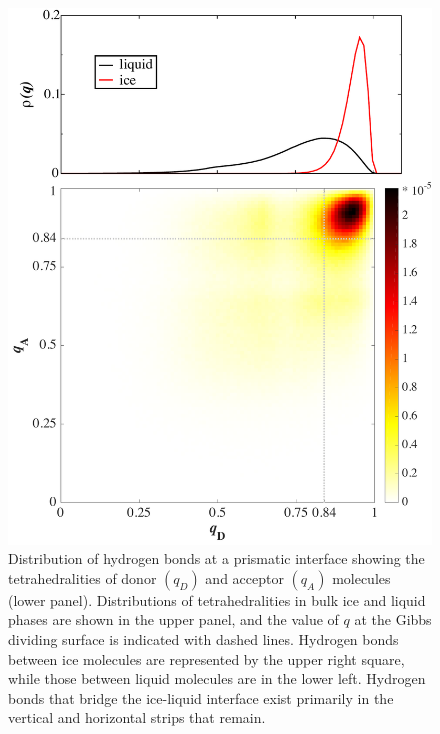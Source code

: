 \newpage
\begin{figure}
\includegraphics[width=5in]{Figures/hbtet.pdf}
\caption{\label{fig:tetHBMatrix} Distribution of hydrogen bonds at a
  prismatic interface showing the tetrahedralities of donor $(q_D)$
  and acceptor $(q_A)$ molecules (lower panel). Distributions of
  tetrahedralities in bulk ice and liquid phases are shown in the
  upper panel, and the value of $q$ at the Gibbs dividing surface is
  indicated with dashed lines. Hydrogen bonds between ice molecules
  are represented by the upper right square, while those between
  liquid molecules are in the lower left.  Hydrogen bonds that bridge
  the ice-liquid interface exist primarily in the vertical and
  horizontal strips that remain.}
\end{figure}


